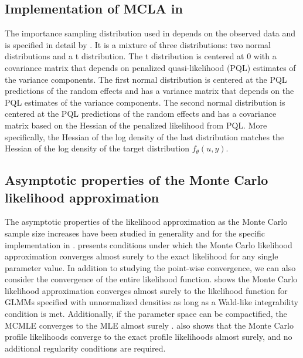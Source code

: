 \documentclass[article]{jss}
\begin{document}
\subsection[Implementation of MCLA in glmm]{Implementation of MCLA in  } \label{sec:myimplem}

The importance sampling distribution used in  depends on the observed data and is specified in detail by \citet{mythesis}. It is a mixture of three distributions: two normal distributions and a t distribution. The t distribution is centered at 0 with a covariance matrix that depends on penalized quasi-likelihood (PQL) estimates of the variance components. The first normal distribution is centered at the PQL predictions of the random effects and has a variance matrix that depends on the PQL estimates of the variance components. The second normal distribution is  centered at the PQL predictions of the random effects and has a covariance matrix based on the Hessian of the  penalized likelihood from PQL.  More specifically, the Hessian of the log density of the last distribution matches the Hessian of the log density of the target distribution $f_\theta(u,y)$. 





\subsection{Asymptotic properties of the Monte Carlo likelihood approximation}


The asymptotic properties of the likelihood approximation as the Monte Carlo sample size increases have been studied in generality  \citep{geyer:1994, geyer:thom:1992} and   for the specific implementation in  \citep{mythesis}.  \citet{geyer:1994} presents conditions under which  the Monte Carlo likelihood approximation converges almost surely to the exact likelihood for any single parameter value.  In addition to studying the point-wise convergence,  we can also consider  the convergence of the entire likelihood function.
\citet{geyer:1994} shows the Monte Carlo likelihood approximation converges almost surely to the likelihood function for GLMMs specified with  unnormalized densities as long as a Wald-like integrability condition is met.
 Additionally, if the parameter space can be compactified, the MCMLE converges to the MLE almost surely \citep{geyer:1994}. \citet{geyer:1994} also shows that the Monte Carlo profile likelihoods converge to the exact profile likelihoods almost surely, and no additional regularity conditions are required.\\
\end{document}
